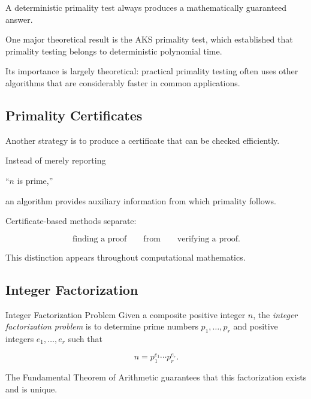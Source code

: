 A deterministic primality test always produces a mathematically guaranteed
answer.

One major theoretical result is the AKS primality test, which established
that primality testing belongs to deterministic polynomial time.

Its importance is largely theoretical: practical primality testing often
uses other algorithms that are considerably faster in common applications.

\subsection{Primality Certificates}
\label{subsec:primality-certificates}

Another strategy is to produce a certificate that can be checked efficiently.

Instead of merely reporting

\begin{center}
``\(n\) is prime,''
\end{center}

an algorithm provides auxiliary information from which primality follows.

Certificate-based methods separate:

\[
\boxed{
\text{finding a proof}
\qquad\text{from}\qquad
\text{verifying a proof}.
}
\]

This distinction appears throughout computational mathematics.

\subsection{Integer Factorization}
\label{subsec:integer-factorization-computational}

\begin{definitionbox}{Integer Factorization Problem}
Given a composite positive integer \(n\), the \emph{integer factorization
problem} is to determine prime numbers \(p_1,\ldots,p_r\) and positive
integers \(e_1,\ldots,e_r\) such that

\[ n=p_1^{e_1}\cdots p_r^{e_r}. \]
\end{definitionbox}

The Fundamental Theorem of Arithmetic guarantees that this factorization
exists and is unique.

